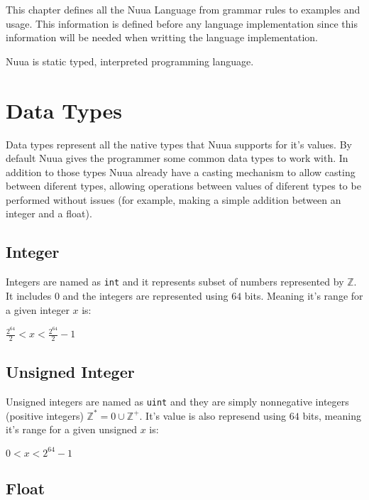 This chapter defines all the Nuua Language from grammar rules to examples and usage. This information
is defined before any language implementation since this information will be needed when writting the
language implementation.

Nuua is static typed, interpreted programming language.

\section{Data Types}

Data types represent all the native types that Nuua supports for it's values. By default Nuua
gives the programmer some common data types to work with. In addition to those types
Nuua already have a casting mechanism to allow casting between diferent types, allowing
operations between values of diferent types to be performed without issues (for example, making a simple
addition between an integer and a float).

\subsection{Integer}

Integers are named as \texttt{int} and it represents subset of numbers represented by $\mathbb{Z}$. It includes 0
and the integers are represented using $64$ bits. Meaning it's range for a given integer $x$ is:

\begin{center}
$\frac{2^{64}}{2} < x < \frac{2^{64}}{2} - 1$
\end{center}

\subsection{Unsigned Integer}

Unsigned integers are named as \texttt{uint} and they are simply nonnegative integers (positive integers) $\mathbb{Z}^*={0} \cup \mathbb{Z}^+$.
It's value is also represend using $64$ bits, meaning it's range for a given unsigned $x$ is:

\begin{center}
    $0 < x < 2^{64} - 1$
\end{center}

\subsection{Float}

